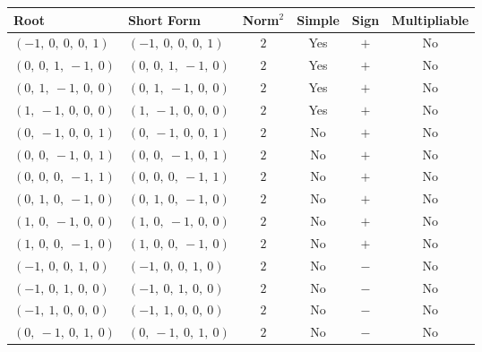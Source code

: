 \documentclass[11pt]{article}
\newcommand{\noi}{\noindent}
\theoremstyle{definition}
\begin{document}
\noi \begin{tabular}{|l|l|c|c|c|c|}
    \hline
    \textbf{Root} & \textbf{Short Form} & \textbf{Norm$^2$} & \textbf{Simple} & \textbf{Sign} & \textbf{Multipliable} \\
    \hline
    $\left( -1, \  0, \  0, \  0, \  1\right)$ & $\left( -1, \  0, \  0, \  0, \  1\right)$ & $2$ & Yes & $+$ & No \\
    \hline
    $\left( 0, \  0, \  1, \  -1, \  0\right)$ & $\left( 0, \  0, \  1, \  -1, \  0\right)$ & $2$ & Yes & $+$ & No \\
    \hline
    $\left( 0, \  1, \  -1, \  0, \  0\right)$ & $\left( 0, \  1, \  -1, \  0, \  0\right)$ & $2$ & Yes & $+$ & No \\
    \hline
    $\left( 1, \  -1, \  0, \  0, \  0\right)$ & $\left( 1, \  -1, \  0, \  0, \  0\right)$ & $2$ & Yes & $+$ & No \\
    \hline
    $\left( 0, \  -1, \  0, \  0, \  1\right)$ & $\left( 0, \  -1, \  0, \  0, \  1\right)$ & $2$ & No & $+$ & No \\
    \hline
    $\left( 0, \  0, \  -1, \  0, \  1\right)$ & $\left( 0, \  0, \  -1, \  0, \  1\right)$ & $2$ & No & $+$ & No \\
    \hline
    $\left( 0, \  0, \  0, \  -1, \  1\right)$ & $\left( 0, \  0, \  0, \  -1, \  1\right)$ & $2$ & No & $+$ & No \\
    \hline
    $\left( 0, \  1, \  0, \  -1, \  0\right)$ & $\left( 0, \  1, \  0, \  -1, \  0\right)$ & $2$ & No & $+$ & No \\
    \hline
    $\left( 1, \  0, \  -1, \  0, \  0\right)$ & $\left( 1, \  0, \  -1, \  0, \  0\right)$ & $2$ & No & $+$ & No \\
    \hline
    $\left( 1, \  0, \  0, \  -1, \  0\right)$ & $\left( 1, \  0, \  0, \  -1, \  0\right)$ & $2$ & No & $+$ & No \\
    \hline
    $\left( -1, \  0, \  0, \  1, \  0\right)$ & $\left( -1, \  0, \  0, \  1, \  0\right)$ & $2$ & No & $-$ & No \\
    \hline
    $\left( -1, \  0, \  1, \  0, \  0\right)$ & $\left( -1, \  0, \  1, \  0, \  0\right)$ & $2$ & No & $-$ & No \\
    \hline
    $\left( -1, \  1, \  0, \  0, \  0\right)$ & $\left( -1, \  1, \  0, \  0, \  0\right)$ & $2$ & No & $-$ & No \\
    \hline
    $\left( 0, \  -1, \  0, \  1, \  0\right)$ & $\left( 0, \  -1, \  0, \  1, \  0\right)$ & $2$ & No & $-$ & No \\

\end{tabular}
\end{document}
